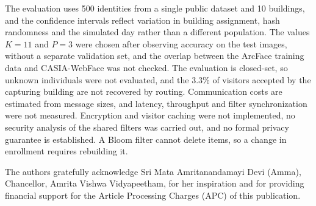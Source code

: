 \documentclass[pdflatex,sn-mathphys-num]{sn-jnl}%
\theoremstyle{thmstyleone}%
\theoremstyle{thmstyletwo}%
\theoremstyle{thmstylethree}%
\begin{document}
The evaluation uses 500 identities from a single public dataset and 10 buildings, and the confidence intervals reflect variation in building assignment, hash randomness and the simulated day rather than a different population. The values $K=11$ and $P=3$ were chosen after observing accuracy on the test images, without a separate validation set, and the overlap between the ArcFace training data and CASIA-WebFace was not checked. The evaluation is closed-set, so unknown individuals were not evaluated, and the 3.3\% of visitors accepted by the capturing building are not recovered by routing. Communication costs are estimated from message sizes, and latency, throughput and filter synchronization were not measured. Encryption and visitor caching were not implemented, no security analysis of the shared filters was carried out, and no formal privacy guarantee is established. A Bloom filter cannot delete items, so a change in enrollment requires rebuilding it.


The authors gratefully acknowledge Sri Mata Amritanandamayi Devi (Amma), Chancellor, Amrita Vishwa Vidyapeetham, for her inspiration and for providing financial support for the Article Processing Charges (APC) of this publication.

\end{document}
